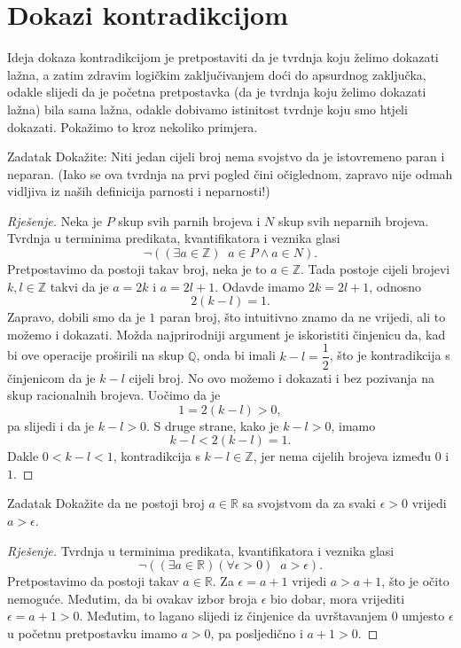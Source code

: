 \section{Dokazi kontradikcijom}
Ideja dokaza kontradikcijom je pretpostaviti da je tvrdnja koju želimo dokazati lažna, a zatim zdravim logičkim zaključivanjem doći do apsurdnog zaključka, odakle slijedi da je početna pretpostavka (da je tvrdnja koju želimo dokazati lažna) bila sama lažna, odakle dobivamo istinitost tvrdnje koju smo htjeli dokazati. Pokažimo to kroz nekoliko primjera.
\begin{exercise}{Zadatak}
Dokažite: Niti jedan cijeli broj nema svojstvo da je istovremeno paran i neparan. (Iako se ova tvrdnja na prvi pogled čini očiglednom, zapravo nije odmah vidljiva iz naših definicija parnosti i neparnosti!)
\end{exercise}
\begin{proof}[Rješenje]
Neka je \(P\) skup svih parnih brojeva i \(N\) skup svih neparnih brojeva. Tvrdnja u terminima predikata, kvantifikatora i veznika glasi
\[\neg\left(\left(\exists a\in \mathbb{Z}\right)\;\; a\in P \wedge a\in N\right).\]
Pretpostavimo da postoji takav broj, neka je to \(a\in \mathbb{Z}\). Tada postoje cijeli brojevi \(k, l\in \mathbb{Z}\) takvi da je \(a=2k\) i \(a=2l+1\). Odavde imamo \(2k=2l+1\), odnosno 
\[2(k-l)=1.\]
Zapravo, dobili smo da je \(1\) paran broj, što intuitivno znamo da ne vrijedi, ali to možemo i dokazati. Možda najprirodniji argument je iskoristiti činjenicu da, kad bi ove operacije proširili na skup \(\mathbb{Q}\), onda bi imali \(k-l=\dfrac{1}{2}\), što je kontradikcija s činjenicom da je \(k-l\) cijeli broj. No ovo možemo i dokazati i bez pozivanja na skup racionalnih brojeva. Uočimo da je \[1=2(k-l)>0,\] pa slijedi i da je \(k-l>0\). S druge strane, kako je \(k-l>0\), imamo \[k-l<2(k-l)=1.\] Dakle \(0<k-l<1\), kontradikcija s \(k-l\in \mathbb{Z}\), jer nema cijelih brojeva između \(0\) i \(1\).
\end{proof}
\begin{exercise}{Zadatak}
Dokažite da ne postoji broj \(a\in \mathbb{R}\) sa svojstvom da za svaki \(\epsilon>0\) vrijedi \(a>\epsilon\).
\end{exercise}
\begin{proof}[Rješenje]
Tvrdnja u terminima predikata, kvantifikatora i veznika glasi
\[\neg\left(\left(\exists a\in \mathbb{R}\right)(\forall \epsilon>0)\;\; a>\epsilon\right).\]
Pretpostavimo da postoji takav \(a\in \mathbb{R}\). Za \(\epsilon=a+1\) vrijedi \(a>a+1\), što je očito nemoguće. Međutim, da bi ovakav izbor broja \(\epsilon\) bio dobar, mora vrijediti \(\epsilon=a+1>0\). Međutim, to lagano slijedi iz činjenice da uvrštavanjem \(0\) umjesto \(\epsilon\) u početnu pretpostavku imamo \(a>0\), pa posljedično i \(a+1>0\).
\end{proof}
